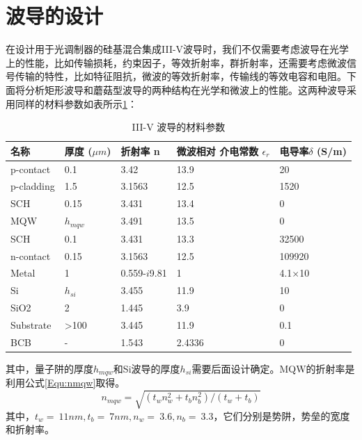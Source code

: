 \section{波导的设计}
在设计用于光调制器的硅基混合集成III-V波导时，我们不仅需要考虑波导在光学上的性能，比如传输损耗，约束因子，等效折射率，群折射率，还需要考虑微波信号传输的特性，比如特征阻抗，微波的等效折射率，传输线的等效电容和电阻。下面将分析矩形波导和蘑菇型波导的两种结构在光学和微波上的性能。这两种波导采用同样的材料参数如表所示\ref{epi_structure}\cite{yongbophd}：
{
	\begin{table}[htb]
		\caption{III-V 波导的材料参数}
		\label{epi_structure}
		\centering
		\begin{tabular}[t]{lllll}
			\hline
			名称 & 厚度 ($\mu m$) & 折射率 n& \tabincell{l}{微波相对 \\ 介电常数 $\epsilon_r$} & 电导率$\delta$ (S/m) \\
			\hline
			p-contact & 0.1 & 3.42 & 13.9 & 20 \\
			p-cladding  & 1.5 & 3.1563 & 12.5 & 1520 \\
			SCH & 0.15 & 3.431 & 13.4 & 0 \\
			MQW & $h_{mqw}$ & 3.491 & 13.5 & 0 \\
			SCH & 0.1 & 3.431 & 13.3 & 32500\\
			n-contact & 0.15 & 3.1563 & 12.5 & 109920 \\
			Metal & 1 & 0.559-$i$9.81 & 1 & 4.1$\times$10\SP{7}\\
			Si & $h_{si}$&3.455 & 11.9 & 10  \\
			SiO2 & 2 & 1.445 & 3.9 & 0\\
			Substrate & >100 & 3.445 & 11.9 & 0.1\\
			BCB & - &1.543 & 2.4336 &0 \\
			\hline
		\end{tabular}
	\end{table}
}
其中，量子阱的厚度$h_{mqw}$和Si波导的厚度$h_{si}$需要后面设计确定。MQW的折射率是利用公式\ref{Equ:nmqw}取得。
\begin{equation}
\label{Equ:nmqw}
n_{mqw}=\sqrt{(t_w n_w^2+t_b n_b^2)/(t_w+t_b)}
\end{equation}
其中，$t_w = ~11 nm, t_b =~ 7 nm, n_w =~ 3.6, n_b = ~3.3$，它们分别是势阱，势垒的宽度和折射率。

